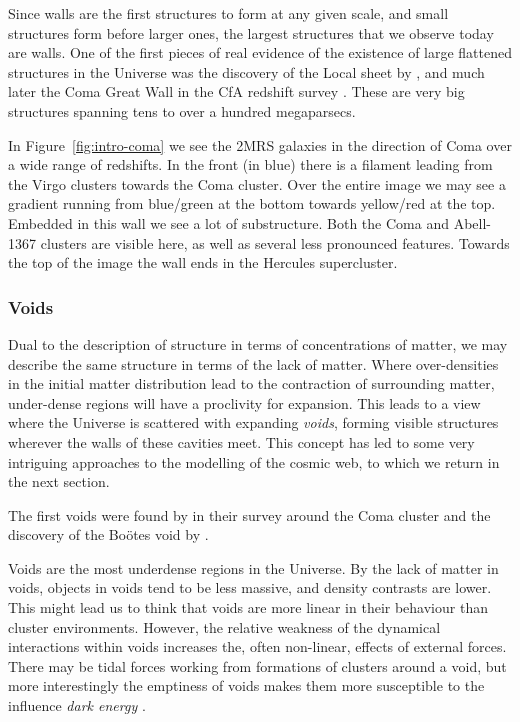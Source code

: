 Since walls are the first structures to form at any given scale, and small structures form before larger ones, the largest structures that we observe today are walls. One of the first pieces of real evidence of the existence of large flattened structures in the Universe was the discovery of the Local sheet by \citet{Vaucouleurs1953}, and much later the Coma Great Wall in the \acs{CfA} redshift survey \citep{Geller1989}. These are very big structures spanning tens to over a hundred megaparsecs.

In Figure~\ref{fig:intro-coma} we see the \ac{2MRS} galaxies in the direction of Coma over a wide range of redshifts. In the front (in blue) there is a filament leading from the Virgo clusters towards the Coma cluster. Over the entire image we may see a gradient running from blue/green at the bottom towards yellow/red at the top. Embedded in this wall we see a lot of substructure. Both the Coma and Abell-1367 clusters are visible here, as well as several less pronounced features. Towards the top of the image the wall ends in the Hercules supercluster.

\subsubsection{Voids}
Dual to the description of structure in terms of concentrations of matter, we may describe the same structure in terms of the lack of matter. Where over-densities in the initial matter distribution lead to the contraction of surrounding matter, under-dense regions will have a proclivity for expansion. This leads to a view where the Universe is scattered with expanding \emph{voids}, forming visible structures wherever the walls of these cavities meet. This concept has led to some very intriguing approaches to the modelling of the cosmic web, to which we return in the next section.

The first voids were found by \citet{Gregory1978} in their survey around the Coma cluster and the discovery of the Bo\"otes void by \citet{Kirshner1981}.

Voids are the most underdense regions in the Universe. By the lack of matter in voids, objects in voids tend to be less massive, and density contrasts are lower. This might lead us to think that voids are more linear in their behaviour than cluster environments. However, the relative weakness of the dynamical interactions within voids increases the, often non-linear, effects of external forces. There may be tidal forces working from formations of clusters around a void, but more interestingly the emptiness of voids makes them more susceptible to the influence \emph{dark energy} \citep{Biswas2010,Bos2012}.

